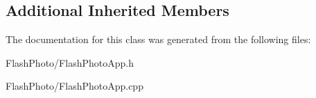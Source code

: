 \subsection*{Additional Inherited Members}


The documentation for this class was generated from the following files\-:\begin{DoxyCompactItemize}
\item 
Flash\-Photo/Flash\-Photo\-App.\-h\item 
Flash\-Photo/Flash\-Photo\-App.\-cpp\end{DoxyCompactItemize}

